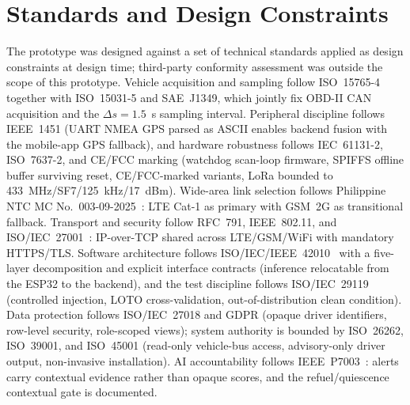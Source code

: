 \documentclass[10pt,journal]{IEEEtran}
\begin{document}
\section{Standards and Design Constraints}
\label{sec:art_standards}
The prototype was designed against a set of technical standards applied as design constraints at design time; third-party conformity assessment was outside the scope of this prototype. Vehicle acquisition and sampling follow ISO~15765-4~\cite{iso15765_4} together with ISO~15031-5 and SAE~J1349, which jointly fix OBD-II CAN acquisition and the $\Delta s = 1.5$~s sampling interval. Peripheral discipline follows IEEE~1451 (UART NMEA GPS parsed as ASCII enables backend fusion with the mobile-app GPS fallback), and hardware robustness follows IEC~61131-2, ISO~7637-2, and CE/FCC marking (watchdog scan-loop firmware, SPIFFS offline buffer surviving reset, CE/FCC-marked variants, LoRa bounded to 433~MHz/SF7/125~kHz/17~dBm). Wide-area link selection follows Philippine NTC MC No.~003-09-2025~\cite{ntc2025legacy_network_phaseout}: LTE Cat-1 as primary with GSM~2G as transitional fallback. Transport and security follow RFC~791, IEEE~802.11, and ISO/IEC~27001~\cite{iso27001}: IP-over-TCP shared across LTE/GSM/WiFi with mandatory HTTPS/TLS. Software architecture follows ISO/IEC/IEEE~42010~\cite{iso42010} with a five-layer decomposition and explicit interface contracts (inference relocatable from the ESP32 to the backend), and the test discipline follows ISO/IEC~29119 (controlled injection, LOTO cross-validation, out-of-distribution clean condition). Data protection follows ISO/IEC~27018 and GDPR (opaque driver identifiers, row-level security, role-scoped views); system authority is bounded by ISO~26262, ISO~39001, and ISO~45001 (read-only vehicle-bus access, advisory-only driver output, non-invasive installation). AI accountability follows IEEE~P7003~\cite{ieeep7003}: alerts carry contextual evidence rather than opaque scores, and the refuel/quiescence contextual gate is documented.
\end{document}
